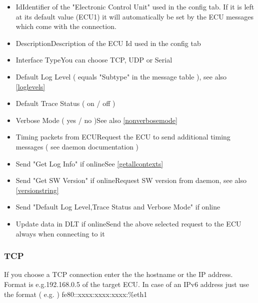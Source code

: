 \documentclass[a4paper,11pt]{article}
\begin{document}
\begin{itemize}
 \item Id\linebreak Identifier of the "Electronic Control Unit" used in the config tab. If it is left at its default value (ECU1) it will automatically be set by the ECU messages which come with the connection.
 \item Description\linebreak Description of the ECU Id used in the config tab
 \item Interface Type\linebreak You can choose TCP, UDP or Serial
 \item Default Log Level ( equals "Subtype" in the message table ), see also \autoref{loglevels}
 \item Default Trace Status ( on / off )
 \item Verbose Mode ( yes / no )\linebreak See also \autoref{nonverbosemode}
 \item Timing packets from ECU\linebreak Request the ECU to send additional timing messages ( see daemon documentation )
 \item Send "Get Log Info" if online\linebreak See \autoref{getallcontexts}
 \item Send "Get SW Version" if online\linebreak Request SW version from daemon, see also \autoref{versionstring}
 \item Send "Default Log Level,Trace Status and Verbose Mode" if online
 \item Update data in DLT if online\linebreak Send the above selected request to the ECU always when connecting to it
\end{itemize}

\subsubsection{TCP}

If you choose a TCP connection enter the the hostname or the IP address.\linebreak
Format is e.g.192.168.0.5 of the target ECU.
\linebreak
In case of an IPv6 address just use the format ( e.g. ) fe80::xxxx:xxxx:xxxx:\%eth1
\end{document}

